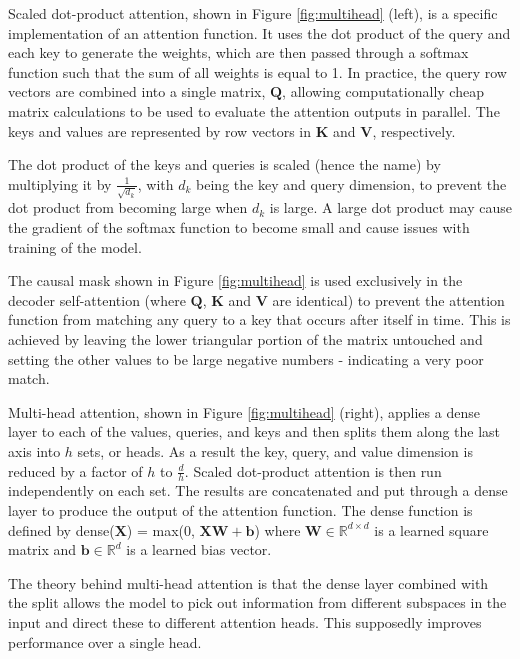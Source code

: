 \documentclass[conference]{IEEEtran}
\begin{document}
Scaled dot-product attention, shown in Figure \ref{fig:multihead} (left), is a specific implementation of an attention function. 
It uses the dot product of the query and each key to generate the weights, which are then passed through a softmax function such that the sum of all weights is equal to 1.
In practice, the query row vectors are combined into a single matrix, $\boldsymbol{Q}$, allowing computationally cheap matrix calculations to be used to evaluate the attention outputs in parallel.
The keys and values are represented by row vectors in $\boldsymbol{K}$ and $\boldsymbol{V}$, respectively.

The dot product of the keys and queries is scaled (hence the name) by multiplying it by $\frac{1}{\sqrt{d_k}}$, with $d_k$ being the key and query dimension, to prevent the dot product from becoming large when $d_k$ is large.
A large dot product may cause the gradient of the softmax function to become small and cause issues with training of the model.

The causal mask shown in Figure \ref{fig:multihead} is used exclusively in the decoder self-attention (where $\boldsymbol{Q}$, $\boldsymbol{K}$ and $\boldsymbol{V}$ are identical) to prevent the attention function from matching any query to a key that occurs after itself in time.
This is achieved by leaving the lower triangular portion of the matrix untouched and setting the other values to be large negative numbers - indicating a very poor match.

Multi-head attention, shown in Figure \ref{fig:multihead} (right), applies a dense layer to each of the values, queries, and keys and then splits them along the last axis into $h$ sets, or heads.
As a result the key, query, and value dimension is reduced by a factor of $h$ to $\frac{d}{h}$.
Scaled dot-product attention is then run independently on each set.
The results are concatenated and put through a dense layer to produce the output of the attention function.
The dense function is defined by dense($\boldsymbol{X}$) = max(0, $\boldsymbol{XW} + \boldsymbol{b}$) where $\boldsymbol{W} \in \mathbb{R}^{d \times d}$ is a learned square matrix and $\boldsymbol{b} \in \mathbb{R}^{d}$ is a learned bias vector.

The theory behind multi-head attention is that the dense layer combined with the split allows the model to pick out information from different subspaces in the input and direct these to different attention heads.
This supposedly improves performance over a single head.
\end{document}
